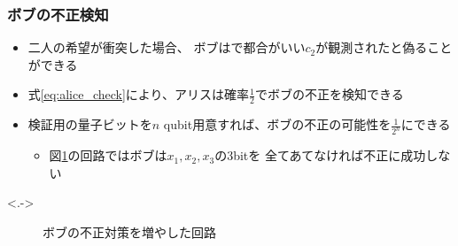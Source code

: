\begin{frame}
  \frametitle{ボブの不正検知}

  \pause
  \begin{itemize}
    \item<+-> 二人の希望が衝突した場合、
    ボブはで都合がいい$c_2$が観測されたと偽ることができる

    \item<+-> 式\ref{eq:alice_check}により、アリスは確率$\frac{1}{2}$でボブの不正を検知できる

    \item<+-> 検証用の量子ビットを$n$ qubit用意すれば、ボブの不正の可能性を$\frac{1}{2^n}$にできる
    \begin{itemize}
      \item 図\ref{fig:bob_cheat_detection}の回路ではボブは$x_1, x_2, x_3$の3bitを
      全てあてなければ不正に成功しない
    \end{itemize}
  \end{itemize}

  \uncover<.->{%
    \begin{figure}
      \caption{ボブの不正対策を増やした回路}
      \label{fig:bob_cheat_detection}
    \end{figure}
  }
\end{frame}


